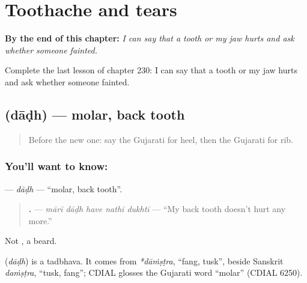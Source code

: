 
\chapter{Toothache and tears}
\label{ch:gu-toothache-and-tears}

\begin{chapteropening}
\textbf{By the end of this chapter:} \emph{I can say that a tooth or my jaw hurts and ask whether someone fainted.}

Complete the last lesson of chapter 230: I can say that a tooth or my jaw hurts and ask whether someone fainted.
\end{chapteropening}

\section[\texorpdfstring{\gu{દાઢ} (dāḍh)}{દાઢ (dāḍh)}]{ (dāḍh) — molar, back tooth}

\label{lesson:GU-C230-dadh}



\begin{quote}
Before the new one: say the Gujarati for heel, then the Gujarati for rib.
\end{quote}

\subsection*{You'll want to know: }
\textbf{} — \emph{dāḍh} — \textquotedblleft{}molar, back tooth\textquotedblright{}.

\begin{quote}
\textbf{    .} — \emph{mārī dāḍh have nathī dukhtī} — \textquotedblleft{}My back tooth doesn't hurt any more.\textquotedblright{}
\end{quote}

Not \textbf{}, a beard.

\begin{cousinweb}
\textbf{} (\emph{dāḍh}) is a tadbhava. It comes from \emph{*dāṁṣṭra}, \textquotedblleft{}fang, tusk\textquotedblright{}, beside Sanskrit \emph{daṁṣṭra}, \textquotedblleft{}tusk, fang\textquotedblright{}; CDIAL glosses the Gujarati word \textquotedblleft{}molar\textquotedblright{} (CDIAL 6250).
\end{cousinweb}

